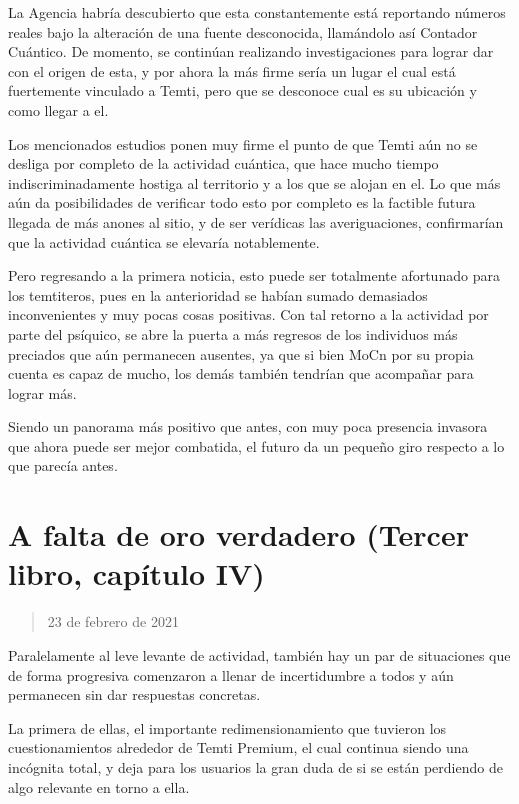 \documentclass[
]{book}
\begin{document}
La Agencia habría descubierto que esta constantemente está reportando números reales bajo la alteración de una fuente desconocida, llamándolo así Contador Cuántico. De momento, se continúan realizando investigaciones para lograr dar con el origen de esta, y por ahora la más firme sería un lugar el cual está fuertemente vinculado a Temti, pero que se desconoce cual es su ubicación y como llegar a el.

Los mencionados estudios ponen muy firme el punto de que Temti aún no se desliga por completo de la actividad cuántica, que hace mucho tiempo indiscriminadamente hostiga al territorio y a los que se alojan en el. Lo que más aún da posibilidades de verificar todo esto por completo es la factible futura llegada de más anones al sitio, y de ser verídicas las averiguaciones, confirmarían que la actividad cuántica se elevaría notablemente.

Pero regresando a la primera noticia, esto puede ser totalmente afortunado para los temtiteros, pues en la anterioridad se habían sumado demasiados inconvenientes y muy pocas cosas positivas. Con tal retorno a la actividad por parte del psíquico, se abre la puerta a más regresos de los individuos más preciados que aún permanecen ausentes, ya que si bien MoCn por su propia cuenta es capaz de mucho, los demás también tendrían que acompañar para lograr más.

Siendo un panorama más positivo que antes, con muy poca presencia invasora que ahora puede ser mejor combatida, el futuro da un pequeño giro respecto a lo que parecía antes.

\hypertarget{a-falta-de-oro-verdadero-tercer-libro-capuxedtulo-iv}{%
\section{A falta de oro verdadero (Tercer libro, capítulo IV)}\label{a-falta-de-oro-verdadero-tercer-libro-capuxedtulo-iv}}

\begin{quote}
23 de febrero de 2021
\end{quote}

Paralelamente al leve levante de actividad, también hay un par de situaciones que de forma progresiva comenzaron a llenar de incertidumbre a todos y aún permanecen sin dar respuestas concretas.

La primera de ellas, el importante redimensionamiento que tuvieron los cuestionamientos alrededor de Temti Premium, el cual continua siendo una incógnita total, y deja para los usuarios la gran duda de si se están perdiendo de algo relevante en torno a ella.
\end{document}
